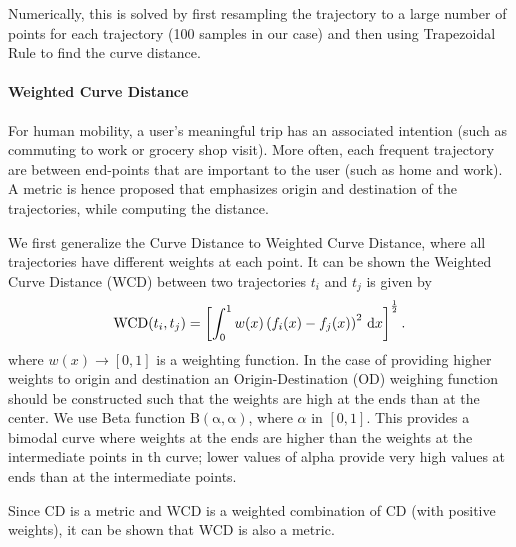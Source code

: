 Numerically, this is solved by first resampling the trajectory to a large number of points for each trajectory (100 samples in our case) and then using Trapezoidal Rule to find the curve distance. %

\paragraph{Weighted Curve Distance} For human mobility, a user's meaningful trip has an associated intention (such as commuting to work or grocery shop visit). More often, each frequent trajectory are between end-points that are important to the user (such as home and work). A metric is hence proposed that emphasizes origin and destination of the trajectories, while computing the distance. 

We first generalize the Curve Distance to Weighted Curve Distance, where all trajectories have different weights at each point.  It can be shown the Weighted Curve Distance (WCD) between two trajectories $t_i$ and $t_j$ is given by
\begin{align}
\operatorname{WCD}(t_i,t_j) = \left[ \int_{0}^{1}{ w(x) \left( f_i(x) - f_j(x) \right )^2\, \mathrm{d}x }\right] ^ {\frac{1}{2}}.
\end{align}
\noindent where $w(x) \rightarrow [0,1]$ is a weighting function. In the case of providing higher weights to origin and destination an Origin-Destination (OD) weighing function should be constructed such that the weights are high at the ends than at the center. We use Beta function $\operatorname{B(\alpha,\alpha)}$, where $\alpha$ in $[0,1]$. This provides a bimodal curve where weights at the ends are higher than the weights at the intermediate points in th curve; lower values of alpha provide very high values at ends than at the intermediate points.

Since CD is a metric and WCD is a weighted combination of CD (with positive weights), it can be shown that WCD is also a metric.


